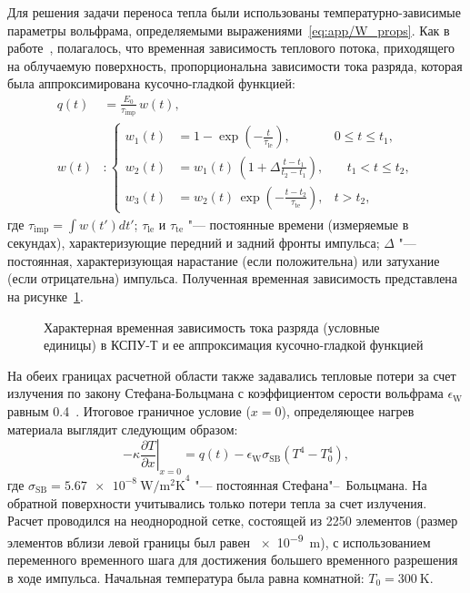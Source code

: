 Для решения задачи переноса тепла были использованы температурно-зависимые параметры вольфрама, определяемыми выражениями~\cref{eq:app/W_props}. Как в работе~\cite{Poskakalov2020}, полагалось, что временная зависимость теплового потока, приходящего на облучаемую поверхность, пропорциональна зависимости тока разряда, которая была аппроксимирована кусочно-гладкой функцией:
\begin{subequations}
	\label{eq:ch3/pulse_form}
	\begin{align}
		q(t) & =\frac{E_0}{\tau_\mathrm{imp}} \, w(t), \\
		w(t) & : \left\{
		\begin{alignedat}{2}
			w_1(t) & = 1 - \exp \left( -\frac{t}{\tau_\mathrm{le}} \right), & 0 \leq t \leq t_1, \\
			w_2(t) & = w_1(t) \, \left( 1 + \Delta \frac{t-t_1}{t_2 - t_1} \right), & \quad t_1 < t \leq t_2, \\
			w_3(t) & = w_2(t) \, \exp \left( -\frac{t-t_2}{\tau_\mathrm{te}} \right), & t > t_2,
		\end{alignedat}
		\right.
	\end{align}
\end{subequations}
где \( \tau_\mathrm{imp}=\int w(t')dt' \);  \( \tau_\mathrm{le}\) и \( \tau_\mathrm{te}\) "--- постоянные времени (измеряемые в секундах), характеризующие передний и задний фронты импульса; \( \Delta \) "--- постоянная, характеризующая нарастание (если положительна) или затухание (если отрицательна) импульса. Полученная временная зависимость представлена на рисунке~\cref{fig:ch3/QSPA_pulse}.
\begin{figure}[ht]
	\caption{Характерная временная зависимость тока разряда (условные единицы) в КСПУ-Т и ее аппроксимация кусочно-гладкой функцией}\label{fig:ch3/QSPA_pulse}
\end{figure}
На обеих границах расчетной области также задавались тепловые потери за счет излучения по закону Стефана-Больцмана с коэффициентом серости вольфрама \( \epsilon_\mathrm{W} \) равным \num{0.4}~\cite{weast1975crc}. Итоговое граничное условие (\( x=0 \)), определяющее нагрев материала выглядит следующим образом:
\begin{equation}
	-\kappa \left. \frac{\partial T}{\partial x} \right\vert_{x=0} = q(t) - \epsilon_\mathrm{W} \sigma_\mathrm{SB} (T^4-T_0^4),
\end{equation}
где \( \sigma_\mathrm{SB} = \SI{5.67e-8}{\watt\per\meter\squared\kelvin}^{4} \) "--- постоянная Стефана"--~Больцмана. На обратной поверхности учитывались только потери тепла за счет излучения. Расчет проводился на неоднородной сетке, состоящей из \num{2250} элементов (размер элементов вблизи левой границы был равен \SI{e-9}{\meter}), с использованием переменного временного шага для достижения большего временного разрешения в ходе импульса. Начальная температура была равна комнатной: \( T_0 = \SI{300}{\kelvin} \).

